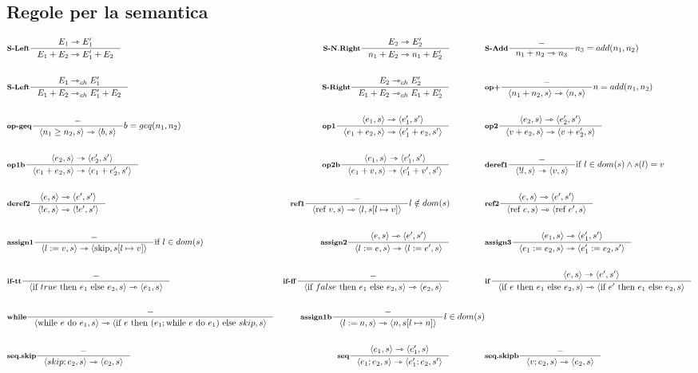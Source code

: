 \documentclass[a4paper, 10pt]{article}
\newcommand{\infer}[4]{\inference[\textbf{#1}]{#2}{#3}#4 }
\newcommand{\srule}[2]{\langle #1 \rangle \rightarrowtriangle \langle #2 \rangle}
\newcommand{\memrep}[3]{#1 \lbrack #2 \mapsto #3 \rbrack}
\newcommand{\goesto}{\rightarrowtriangle}
\begin{document}
\subsection*{Regole per la semantica}
	\begin{align*}
		&\infer{S-Left}{E_1 \goesto E_1' }{E_1 + E_2 \goesto E_1' + E_2}{} 
		&\infer{S-N.Right}{E_2 \goesto E_2'}{n_1 + E_2 \goesto n_1 + E_2'}{} \qquad\qquad
		&\infer{S-Add}{-}{n_1+n_2 \goesto n_3}{n_3 = add(n_1, n_2)} \\ \\
		&\infer{S-Left}{E_1 \goesto_{ch} E_1'}{E_1 + E_2 \goesto_{ch} E_1' + E_2}{} 
		&\infer{S-Right}{E_2 \goesto_{ch} E_2'}{E_1 + E_2 \goesto_{ch} E_1 + E_2'}{} \qquad\qquad
		&\infer{op+}{-}{\srule{n_1 + n_2,s}{n,s}}{n=add(n_1,n_2)} \\ \\
		&\infer{op-geq}{-}{\srule{n_1 \geq n_2,s}{b,s}}{b=geq(n_1, n_2)} 
		&\infer{op1}{\srule{e_1,s}{e_1', s'}}{\srule{e_1 + e_2,s}{e_1' + e_2,s'}}{} \qquad\qquad
		&\infer{op2}{\srule{e_2,s}{e_2', s'}}{\srule{v + e_2,s}{v + e_2',s}}{} \\ \\
		&\infer{op1b}{\srule{e_2,s}{e_2', s'}}{\srule{e_1 + e_2,s}{e_1 + e_2',s'}}{} 
		&\infer{op2b}{\srule{e_1,s}{e_1', s'}}{\srule{e_1 + v,s}{e_1' + v',s'}}{} \qquad\qquad
		&\infer{deref1}{-}{\srule{!l,s}{v,s}}{\text{if } l \in dom(s) \wedge s(l)=v} \\ \\
		&\infer{deref2}{\srule{e,s}{e',s'}}{\srule{!e,s}{!e',s'}}{} 
		&\infer{ref1}{-}{\srule{\text{ref }v, s}{l, \memrep{s}{l}{v}}}{l \notin dom(s)} \qquad\qquad
		&\infer{ref2}{\srule{e,s}{e',s'}}{\srule{\text{ref }e,s}{\text{ref } e',s}}{}\\ \\
		&\infer{assign1}{-}{\srule{l:=v,s}{\text{skip}, \memrep{s}{l}{v}}}{\text{if } l \in dom(s)} 
		&\infer{assign2}{\srule{e,s}{e',s'}}{\srule{l:=e,s}{l:=e',s}}{} \qquad\qquad
		&\infer{assign3}{\srule{e_1,s}{e_1',s'}}{\srule{e_1:=e_2,s}{e_1':=e_2,s'}}{} \\ \\
		&\infer{if-tt}{-}{\srule{\text{if } true \text{ then } e_1 \text{ else } e_2,s}{e_1,s}}{}
		&\infer{if-ff}{-}{\srule{\text{if } false \text{ then } e_1 \text{ else } e_2,s}{e_2,s}}{}\qquad\qquad
		&\infer{if}{\srule{e,s}{e',s'}}{\srule{\text{if } e \text{ then } e_1 \text{ else } e_2,s}{\text{if } e' \text{ then } e_1 \text{ else } e_2,s}}{}\\ \\
		&\infer{while}{-}{\srule{\text{while } e \text{ do } e_1, s}{\text{if } e \text{ then } (e_1; \text{while } e \text{ do } e_1) \text{ else } skip, s}}{}
		&\infer{assign1b}{-}{\srule{l:=n,s}{n, \memrep{s}{l}{n}}}{l \in dom(s)} \\ \\
		&\infer{seq.skip}{-}{\srule{skip;e_2,s}{e_2,s}}{}
		&\infer{seq}{\srule{e_1,s}{e_1',s}}{\srule{e_1;e_2,s}{e_1';e_2,s'}}{}\qquad\qquad
		&\infer{seq.skipb}{-}{\srule{v;e_2,s}{e_2,s}}{}
	\end{align*}
\end{document}
